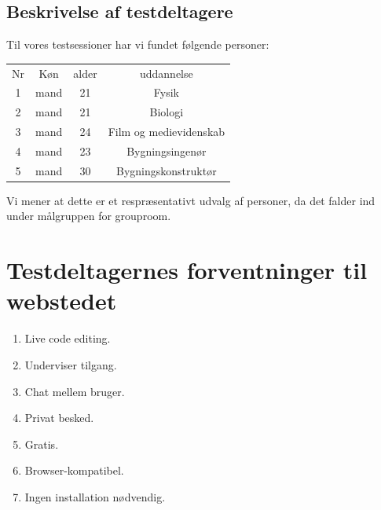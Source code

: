 \documentclass[12pt]{article}
\begin{document}
\subsection{Beskrivelse af testdeltagere}
Til vores testsessioner har vi fundet følgende personer:
\begin{center}
  \begin{tabular}{*{4}{|c}|}
    \hline
    Nr & Køn & alder & uddannelse \\
    1 & mand & 21 & Fysik \\
    2 & mand & 21 & Biologi \\
    3 & mand & 24 & Film og medievidenskab \\
    4 & mand & 23 & Bygningsingenør\\
    5 & mand & 30 & Bygningskonstruktør\\
    \hline
  \end{tabular}
\end{center}
Vi mener at dette er et respræsentativt udvalg af personer, da det falder ind under målgruppen for grouproom.
\section{Testdeltagernes forventninger til webstedet}
\begin{enumerate}
  \item Live code editing.
  \item Underviser tilgang.
  \item Chat mellem bruger.
  \item Privat besked.
  \item Gratis.
  \item Browser-kompatibel.
  \item Ingen installation nødvendig.
\end{enumerate}

\newpage
\end{document}
